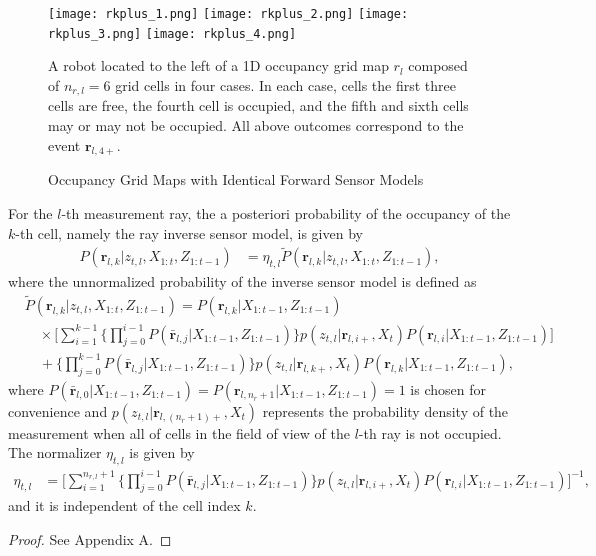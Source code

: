 \begin{figure}
  \centering
  \texttt{[image: rkplus\_1.png]}
    \centering
  \texttt{[image: rkplus\_2.png]}  
  \centering
  \texttt{[image: rkplus\_3.png]}
    \centering
  \texttt{[image: rkplus\_4.png]}
  \caption{Occupancy Grid Maps with Identical Forward Sensor Models}
  \medskip
  \small
  A robot located to the left of a 1D occupancy grid map $r_l$ composed of $n_{r,l}=6$ grid cells in four cases. In each case, cells the first three cells are free, the fourth cell is occupied, and the fifth and sixth cells may or may not be occupied. All above outcomes correspond to the event $\mathbf{r}_{l,4+}$.
  \label{fig:show_rkplus}
\end{figure}

\begin{prop}
\label{prop:ISM}
For the $l$-th measurement ray, the a posteriori probability of the occupancy of the $k$-th cell, namely the ray inverse sensor model, is given by
\begin{align}
\label{eqn:RayISMAnswer}
P(\mathbf{r}_{l,k}|z_{t,l},X_{1:t},Z_{1:t-1})&=\eta_{t,l}\tilde P(\mathbf{r}_{l,k}|z_{t,l},X_{1:t},Z_{1:t-1}),
\end{align}
where the unnormalized probability of the inverse sensor model is defined as
\begin{align}
\label{eqn:Unnormalized}
& \tilde P(\mathbf{r}_{l,k}|z_{t,l},X_{1:t},Z_{1:t-1})%
=P(\mathbf{r}_{l,k}|X_{1:t-1},Z_{1:t-1})\nonumber\\
&\quad\times 
\bigg[\sum_{i=1}^{k-1}\bigg\{\prod_{j=0}^{i-1}P(\bar{\mathbf{r}}_{l,j}|X_{1:t-1},Z_{1:t-1})\bigg\}%
p(z_{t,l}|\mathbf{r}_{l,i+},X_t)P(\mathbf{r}_{l,i}|X_{1:t-1},Z_{1:t-1})\bigg]\nonumber\\
&\quad + \bigg\{\prod_{j=0}^{k-1}P(\bar{\mathbf{r}}_{l,j}|X_{1:t-1},Z_{1:t-1})\bigg\}%
p(z_{t,l}|\mathbf{r}_{l,k+},X_t)P(\mathbf{r}_{l,k}|X_{1:t-1},Z_{1:t-1}),
\end{align}
where $P(\bar{\mathbf{r}}_{l,0}|X_{1:t-1},Z_{1:t-1})=P(\mathbf{r}_{l,n_r+1}|X_{1:t-1},Z_{1:t-1})=1$ is chosen for convenience and $p(z_{t,l}|\mathbf{r}_{l,(n_r+1)+},X_t)$ represents the probability density of the measurement when all of cells in the field of view of the $l$-th ray is not occupied. The normalizer $\eta_{t,l}$ is given by
\begin{align}
\label{eqn:allEta}
\eta_{t,l}
&=
\bigg[\sum_{i=1}^{n_{r,l}+1}\bigg\{\prod_{j=0}^{i-1}P(\bar{\mathbf{r}}_{l,j}|X_{1:t-1},Z_{1:t-1})\bigg\}p(z_{t,l}|\mathbf{r}_{l,i+},X_t)P(\mathbf{r}_{l,i}|X_{1:t-1},Z_{1:t-1})\bigg]^{-1},
\end{align}
and it is independent of the cell index $k$.
\end{prop}
\begin{proof}%
See Appendix A.
\end{proof}

